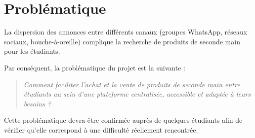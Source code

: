 ﻿\chapter{Problématique}

La dispersion des annonces entre différents canaux (groupes WhatsApp, réseaux sociaux, bouche-à-oreille) complique la recherche de produits de seconde main pour les étudiants.

Par conséquent, la problématique du projet est la suivante :

\begin{quote}
\textit{Comment faciliter l'achat et la vente de produits de seconde main entre étudiants au sein d'une plateforme centralisée, accessible et adaptée à leurs besoins ?}
\end{quote}

Cette problématique devra être confirmée auprès de quelques étudiants afin de vérifier qu'elle correspond à une difficulté réellement rencontrée.
